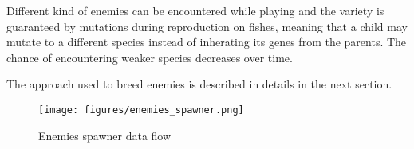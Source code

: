 \documentclass[11pt]{article}
\begin{document}
Different kind of enemies can be encountered while playing and the variety is guaranteed by mutations during reproduction on fishes, meaning that a child may mutate to a different species instead of inherating its genes from the parents. The chance of encountering weaker species decreases over time.

The approach used to breed enemies is described in details in the next section.

\begin{figure}[H]
  \centering
  \texttt{[image: figures/enemies\_spawner.png]}
  \caption{Enemies spawner data flow}
\end{figure}
\end{document}
